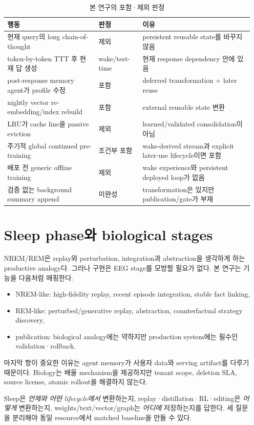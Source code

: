 \begin{table}[htbp]
\centering
\caption{본 연구의 포함·제외 판정}
\label{tab:stc-inclusion}
\small
\begin{tabularx}{\textwidth}{p{} X X}
\toprule
행동 & 판정 & 이유 \\
\midrule
현재 query의 long chain-of-thought & 제외 & persistent reusable state를 바꾸지 않음 \\
token-by-token TTT 후 현재 답 생성 & wake/test-time & 현재 response dependency 안에 있음 \\
post-response memory agent가 profile 수정 & 포함 & deferred transformation + later reuse \\
nightly vector re-embedding/index rebuild & 포함 & external reusable state 변환 \\
LRU가 cache line을 passive eviction & 제외 & learned/validated consolidation이 아님 \\
주기적 global continued pre-training & 조건부 포함 & wake-derived stream과 explicit later-use lifecycle이면 포함 \\
배포 전 generic offline training & 제외 & wake experience와 persistent deployed loop가 없음 \\
검증 없는 background summary append & 미완성 & transformation은 있지만 publication/gate가 부재 \\
\bottomrule
\end{tabularx}
\end{table}

\section{Sleep phase와 biological stages}

NREM/REM은 replay와 perturbation, integration과 abstraction을 생각하게 하는 productive analogy다.
그러나 구현은 EEG stage를 모방할 필요가 없다. 본 연구는 기능을 다음처럼 매핑한다.

\begin{itemize}
  \item NREM-like: high-fidelity replay, recent episode integration, stable fact linking,
  \item REM-like: perturbed/generative replay, abstraction, counterfactual strategy discovery,
  \item publication: biological analogy에는 약하지만 production system에는 필수인 validation·rollback.
\end{itemize}

마지막 항이 중요한 이유는 agent memory가 사용자 data와 serving artifact를 다루기 때문이다. Biology는
배울 mechanism을 제공하지만 tenant scope, deletion SLA, source license, atomic rollout을 해결하지 않는다.

\begin{cautionbox}
Sleep은 \emph{언제와 어떤 lifecycle에서} 변환하는지, replay·distillation·RL·editing은 \emph{어떻게}
변환하는지, weights/text/vector/graph는 \emph{어디에} 저장하는지를 답한다. 세 질문을 분리해야
동일 resource에서 matched baseline을 만들 수 있다.
\end{cautionbox}
